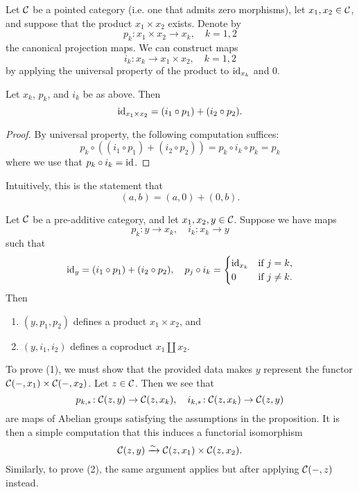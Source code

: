 \begin{construction}\label{construction:pre-additive-product-inclusions}
	Let \(\mathcal{C}\) be a pointed category (i.e. one that admits zero morphisms), let \(x_1,x_2\in\mathcal{C}\), and suppose that the product \(x_1\times x_2\) exists. Denote by
	\[ p_k\!:x_1\times x_2 \to x_k,\quad k=1,2 \]
	the canonical projection maps. We can construct maps
	\[ i_k\!:x_k\to x_1\times x_2,\quad k=1,2 \]
	by applying the universal property of the product to \(\mathrm{id}_{x_k}\) and \(0\).
\end{construction}
\begin{proposition}
	Let \(x_k\), \(p_k\), and \(i_k\) be as above. Then
	\[ \mathrm{id}_{x_1\times x_2} = (i_1\circ p_1) + (i_2\circ p_2). \]
\end{proposition}
\begin{proof}
By universal property, the following computation suffices:
\[ p_k \circ ((i_1\circ p_1) + (i_2\circ p_2)) = p_k\circ i_k\circ p_k = p_k \]
where we use that \(p_k\circ i_k = \mathrm{id}\).
\end{proof}
\begin{remark}
	Intuitively, this is the statement that
	\[ (a,b) = (a,0) + (0,b). \]
\end{remark}
\begin{proposition}\label{prop:pre-additive-direct-sum-data}
	Let \(\mathcal{C}\) be a pre-additive category, and let \(x_1,x_2,y\in\mathcal{C}\). Suppose we have maps
	\[ p_k\!:y\to x_k,\quad i_k\!:x_k\to y \]
	such that
	\[ \mathrm{id}_{y} = (i_1\circ p_1) + (i_2\circ p_2),\quad p_j\circ i_k = \begin{cases} \mathrm{id}_{x_k} & \text{if }j=k,\\ 0 & \text{if }j\not=k. \end{cases} \]
	Then
	\begin{enumerate}[label=(\arabic*)]
	\item \((y,p_1,p_2)\) defines a product \(x_1\times x_2\), and
	\item \((y,i_1,i_2)\) defines a coproduct \(x_1\amalg x_2\).
	\end{enumerate}
\end{proposition}
\begin{proofsketch}
To prove (1), we must show that the provided data makes \(y\) represent the functor \(\mathcal{C}(-,x_1)\times\mathcal{C}(-,x_2)\). Let \(z\in\mathcal{C}\). Then we see that
\[  p_{k,*}\!:\mathcal{C}(z,y)\to \mathcal{C}(z,x_k),\quad i_{k,*}\!:\mathcal{C}(z,x_k)\to\mathcal{C}(z,y) \]
are maps of Abelian groups satisfying the assumptions in the proposition. It is then a simple computation that this induces a functorial isomorphism
\[ \mathcal{C}(z,y) \xrightarrow{\sim} \mathcal{C}(z,x_1)\times\mathcal{C}(z,x_2). \]
Similarly, to prove (2), the same argument applies but after applying \(\mathcal{C}(-,z)\) instead.
\end{proofsketch}
